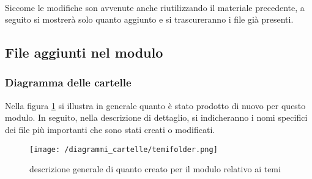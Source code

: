 \paragraph{} Siccome le modifiche son avvenute anche riutilizzando il materiale precedente, a seguito si mostrerà solo quanto aggiunto e si trascureranno i file già presenti.
\subsection{File aggiunti nel modulo}
\subsubsection{Diagramma delle cartelle}
Nella figura \ref{fig:cartelle-tema} si illustra in generale quanto è stato prodotto di nuovo per questo modulo. In seguito, nella descrizione di dettaglio, si indicheranno i nomi specifici dei file più importanti che sono stati creati o modificati.
\begin{figure}
\centering
\texttt{[image: /diagrammi\_cartelle/temifolder.png]}
\caption{descrizione generale di quanto creato per il modulo relativo ai temi\label{fig:cartelle-tema}}
\end{figure}
\FloatBarrier
